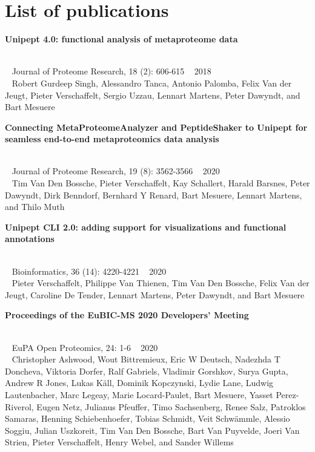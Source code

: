 \chapter*{List of publications}

\raggedbottom

\begin{large}\textbf{\textsf{Unipept 4.0: functional analysis of metaproteome data}}\end{large} \\
\faBook ~ \textsf{Journal of Proteome Research, 18 (2): 606-615} \hfill \faCalendar ~ \textsf{2018} \\
{
    \myriad
    \faUser ~ Robert Gurdeep Singh, Alessandro Tanca, Antonio Palomba, Felix Van der Jeugt, \textsf{Pieter Verschaffelt}, Sergio Uzzau, Lennart Martens, Peter Dawyndt, and Bart Mesuere \\
}

\begin{large}\textbf{\textsf{Connecting MetaProteomeAnalyzer and PeptideShaker to Unipept for seamless end-to-end metaproteomics data analysis}}\end{large} \\
\faBook ~ \textsf{Journal of Proteome Research, 19 (8): 3562-3566} \hfill \faCalendar ~ \textsf{2020} \\
{
    \myriad
    \faUser ~ Tim Van Den Bossche, \textsf{Pieter Verschaffelt}, Kay Schallert, Harald Barsnes, Peter Dawyndt, Dirk Benndorf, Bernhard Y Renard, Bart Mesuere, Lennart Martens, and Thilo Muth \\
}

\begin{large}\textbf{\textsf{Unipept CLI 2.0: adding support for visualizations and functional annotations}}\end{large} \\
\faBook ~ \textsf{Bioinformatics, 36 (14): 4220-4221} \hfill \faCalendar ~ \textsf{2020} \\
{
    \myriad
    \faUser ~ \textsf{Pieter Verschaffelt}, Philippe Van Thienen, Tim Van Den Bossche, Felix Van der Jeugt, Caroline De Tender, Lennart Martens, Peter Dawyndt, and Bart Mesuere \\
}

\begin{large}\textbf{\textsf{Proceedings of the EuBIC-MS 2020 Developers' Meeting}}\end{large} \\
\faBook ~ \textsf{EuPA Open Proteomics, 24: 1-6} \hfill \faCalendar ~ \textsf{2020} \\
{
    \myriad
    \faUser ~ Christopher Ashwood, Wout Bittremieux, Eric W Deutsch, Nadezhda T Doncheva, Viktoria Dorfer, Ralf Gabriels, Vladimir Gorshkov, Surya Gupta, Andrew R Jones, Lukas Käll, Dominik Kopczynski, Lydie Lane, Ludwig Lautenbacher, Marc Legeay, Marie Locard-Paulet, Bart Mesuere, Yasset Perez-Riverol, Eugen Netz, Julianus Pfeuffer, Timo Sachsenberg, Renee Salz, Patroklos Samaras, Henning Schiebenhoefer, Tobias Schmidt, Veit Schwämmle, Alessio Soggiu, Julian Uszkoreit, Tim Van Den Bossche, Bart Van Puyvelde, Joeri Van Strien, \textsf{Pieter Verschaffelt}, Henry Webel, and Sander Willems \\
}

